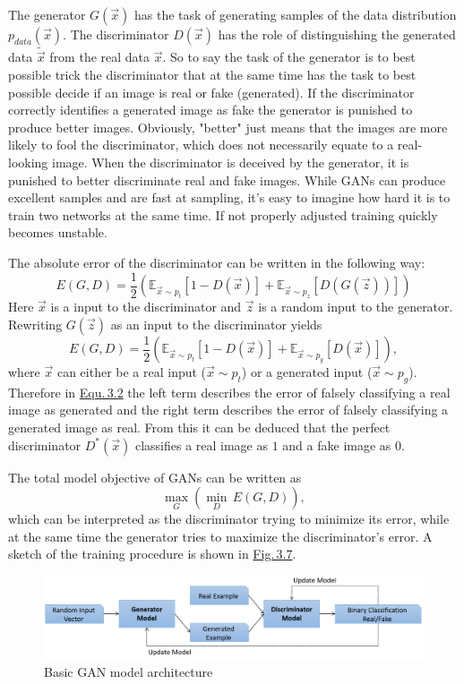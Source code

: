The generator $G(\vec{x})$ has the task of generating samples of the data distribution $p_{data}(\vec{x})$. The discriminator $D(\vec{x})$ has the role of distinguishing the generated data $\tilde{\vec{x}}$ from the real data $\vec{x}$. So to say the task of the generator is to best possible trick the discriminator that at the same time has the task to best possible decide if an image is real or fake (generated). If the discriminator correctly identifies a generated image as fake the generator is punished to produce better images. Obviously, "better" just means that the images are more likely to fool the discriminator, which does not necessarily equate to a real-looking image. When the discriminator is deceived by the generator, it is punished to better discriminate real and fake images. While GANs can produce excellent samples and are fast at sampling, it's easy to imagine how hard it is to train two networks at the same time. If not properly adjusted training quickly becomes unstable.

The absolute error of the discriminator can be written in the following way:
%
\begin{equation}
    E(G,D)=\frac{1}{2}\left(\mathbb{E}_{\vec{x}\sim p_{t}}[1-D(\vec{x})]+\mathbb{E}_{\vec{x}\sim p_{z}}[D(G(\vec{z}))]\right)
\end{equation}
%
Here $\vec{x}$ is a input to the discriminator and $\vec{z}$ is a random input to the generator. Rewriting $G(\vec{z})$ as an input to the discriminator yields
%
\begin{equation} \label{equ:3.2}
    E(G,D)=\frac{1}{2}\left(\mathbb{E}_{\vec{x}\sim p_{t}}[1-D(\vec{x})]+\mathbb{E}_{\vec{x}\sim p_{g}}[D(\vec{x})]\right),
\end{equation}
%
where $\vec{x}$ can either be a real input ($\vec{x}\sim p_t$) or a generated input ($\vec{x}\sim p_g$). Therefore in \hyperref[equ:3.2]{Equ.\,3.2} the left term describes the error of falsely classifying a real image as generated and the right term describes the error of falsely classifying a generated image as real. From this it can be deduced that the perfect discriminator $D^*(\vec{x})$ classifies a real image as $1$ and a fake image as $0$. 

The total model objective of GANs can be written as 
%
\begin{equation} \label{equ:3.3}
    \underset{G}{\max}\left(\underset{D}{\min}\,E(G,D)\right),
\end{equation}
%
which can be interpreted as the discriminator trying to minimize its error, while at the same time the generator tries to maximize the discriminator's error. A sketch of the training procedure is shown in \hyperref[fig:3.7]{Fig.\,3.7}. 
%
\begin{figure} \label{fig:3.7}
    \centering
    \includegraphics[width=.9\textwidth]{Chapters/figures/gan.PNG}
    \caption[Basic GAN model architecture]{Basic GAN model architecture}
\end{figure}
%

